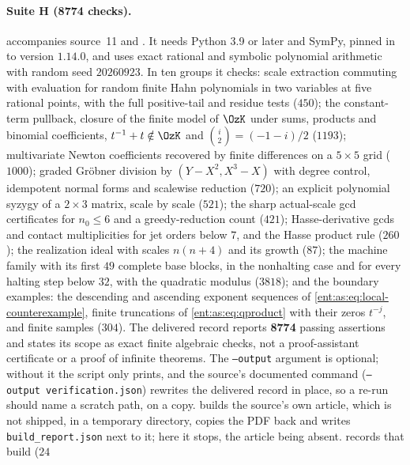 \documentclass[11pt]{article}
\theoremstyle{plain}
\theoremstyle{plain}
\theoremstyle{plain}
\theoremstyle{definition}
\theoremstyle{definition}
\theoremstyle{definition}
\theoremstyle{definition}
\theoremstyle{remark}
\begin{document}
\paragraph{Suite H (8774 checks).}
 accompanies source~11 and
. It needs Python 3.9
or later and SymPy, pinned in 
to version $1.14.0$, and uses exact rational and symbolic polynomial
arithmetic with random seed $20260923$. In ten groups it checks: scale
extraction commuting with evaluation for random finite Hahn polynomials in two
variables at five rational points, with the full positive-tail and residue
tests ($450$); the constant-term pullback, closure of the finite model of
$\OzK$ under sums, products and binomial coefficients, $t^{-1}+t\notin\OzK$ and
$\binom i2=(-1-i)/2$ ($1193$); multivariate Newton coefficients recovered by
finite differences on a $5\times5$ grid ($1000$); graded Gr\"obner division by
$(Y-X^2,X^3-X)$ with degree control, idempotent normal forms and scalewise
reduction ($720$); an explicit polynomial syzygy of a $2\times3$ matrix, scale
by scale ($521$); the sharp actual-scale gcd certificates for $n_0\le6$ and a
greedy-reduction count ($421$); Hasse-derivative gcds and contact
multiplicities for jet orders below $7$, and the Hasse product rule ($260$);
the realization ideal with scales $n(n+4)$ and its growth ($87$); the machine
family with its first $49$ complete base blocks, in the nonhalting case and for
every halting step below $32$, with the quadratic modulus ($3818$); and the
boundary examples: the descending and ascending exponent sequences of
\eqref{ent:as:eq:local-counterexample}, finite truncations of
\eqref{ent:as:eq:qproduct} with their zeros $t^{-j}$, and finite samples
($304$). The delivered record 
reports \textbf{8774} passing assertions and states its scope as exact finite
algebraic checks, not a proof-assistant certificate or a proof of infinite
theorems. The \texttt{--output} argument is optional; without it the script
only prints, and the source's documented command
(\texttt{--output verification.json}) rewrites the delivered record in place,
so a re-run should name a scratch path, on a copy.
 builds the source's own article,
which is not shipped, in a temporary directory, copies the PDF back and writes
\texttt{build\_report.json} next to it; here it stops, the article being absent.
 records that build ($24$
\end{document}
